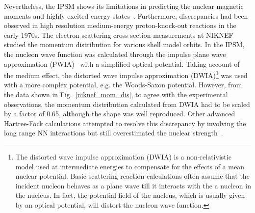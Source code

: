  Nevertheless, the IPSM shows its limitations in predicting the nuclear magnetic moments and highly excited energy states~\cite{review_mft}. Furthermore, discrepancies had been observed in high resolution medium-energy proton-knock-out reactions in the early 1970s. The electron scattering cross section measurements at NIKNEF~\cite{VanDerSteenhoven1988547} studied the momentum distribution for various shell model orbits. In the IPSM, the nucleon wave function was calculated through the impulse plane wave approximation (PWIA)~\cite{DeForest1983} with a simplified optical potential. Taking account of the medium effect, the distorted wave impulse approximation (DWIA)\footnote{The distorted wave impulse approximation (DWIA) is a non-relativistic model used at intermediate energies to compensate for the effects of a mean nuclear potential. Basic scattering reaction calculations often assume that the incident nucleon behaves as a plane wave till it interacts with the a nucleon in the nucleus. In fact, the potential field of the nucleus, which is usually given by an optical potential, will distort the nucleon wave function.} was used with a more complex potential, e.g. the Woods-Saxon potential. However, from the data shown in Fig.~\ref{niknef_mom_dis}, to agree with the experimental observations, the momentum distribution calculated from DWIA had to be scaled by a factor of 0.65, although the shape was well reproduced. Other advanced Hartree-Fock calculations attempted to resolve this discrepancy by involving the long range NN interactions but still overestimated the nuclear strength~\cite{hartree_fock_book}.

